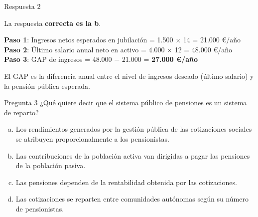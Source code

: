 \documentclass[
  ignorenonframetext,
  aspectratio=54,
  spanish,
]{beamer}
\providecommand{\tightlist}{%
  \setlength{\itemsep}{0pt}\setlength{\parskip}{0pt}}
\begin{document}
\begin{frame}{Respuesta 2}
\label{respuesta-2}
\begin{tcolorbox}[enhanced jigsaw, rightrule=.15mm, colback=white, arc=.35mm, colframe=quarto-callout-tip-color-frame, leftrule=.75mm, bottomrule=.15mm, left=2mm, toprule=.15mm, opacityback=0, breakable]
\begin{minipage}[t]{5.5mm}
\textcolor{quarto-callout-tip-color}{\faLightbulb}
\end{minipage}%
\begin{minipage}[t]{\textwidth - 5.5mm}

La respuesta \textbf{correcta es la b}.

\textbf{Paso 1}: Ingresos netos esperados en jubilación = 1.500 × 14 =
21.000 €/año\\
\textbf{Paso 2}: Último salario anual neto en activo = 4.000 × 12 =
48.000 €/año\\
\textbf{Paso 3}: GAP de ingresos = 48.000 − 21.000 = \textbf{27.000
€/año}

El GAP es la diferencia anual entre el nivel de ingresos deseado (último
salario) y la pensión pública esperada.

\end{minipage}%
\end{tcolorbox}
\end{frame}

\begin{frame}{Pregunta 3}
\label{pregunta-3}
¿Qué quiere decir que el sistema público de pensiones es un sistema de
reparto?

\begin{enumerate}
[a.]
\tightlist
\item
  Los rendimientos generados por la gestión pública de las cotizaciones
  sociales se atribuyen proporcionalmente a los pensionistas.
\item
  Las contribuciones de la población activa van dirigidas a pagar las
  pensiones de la población pasiva.
\item
  Las pensiones dependen de la rentabilidad obtenida por las
  cotizaciones.
\item
  Las cotizaciones se reparten entre comunidades autónomas según su
  número de pensionistas.
\end{enumerate}
\end{frame}
\end{document}
